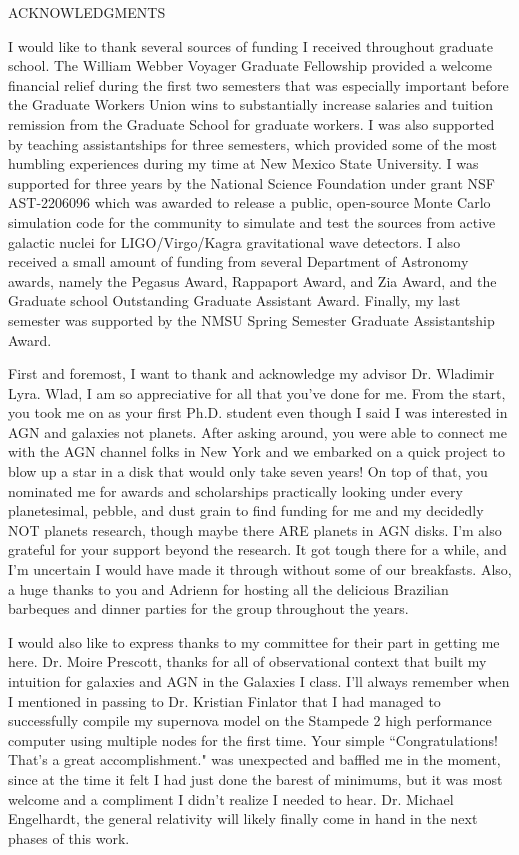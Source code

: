 \begin{center}
ACKNOWLEDGMENTS
\end{center}


I would like to thank several sources of funding I received throughout graduate school.
The William Webber Voyager Graduate Fellowship provided a welcome financial relief during the first two semesters that was especially important before the Graduate Workers Union wins to substantially increase salaries and tuition remission from the Graduate School for graduate workers.
I was also supported by teaching assistantships for three semesters, which provided some of the most humbling experiences during my time at New Mexico State University.
I was supported for three years by the National Science Foundation under grant NSF AST-2206096 which was awarded to release a public, open-source Monte Carlo simulation code for the community to simulate and test the sources from active galactic nuclei for LIGO/Virgo/Kagra gravitational wave detectors.
I also received a small amount of funding from several Department of Astronomy awards, namely the Pegasus Award, Rappaport Award, and Zia Award, and the Graduate school Outstanding Graduate Assistant Award.
Finally, my last semester was supported by the NMSU Spring Semester Graduate Assistantship Award.

First and foremost, I want to thank and acknowledge my advisor Dr. Wladimir Lyra. Wlad, I am so appreciative for all that you've done for me.
From the start, you took me on as your first Ph.D. student even though I said I was interested in AGN and galaxies not planets.
After asking around, you were able to connect me with the AGN channel folks in New York and we embarked on a quick project to blow up a star in a disk that would only take seven years!
On top of that, you nominated me for awards and scholarships practically looking under every planetesimal, pebble, and dust grain to find funding for me and my decidedly NOT planets research, though maybe there ARE planets in AGN disks.
I'm also grateful for your support beyond the research.
It got tough there for a while, and I'm uncertain I would have made it through without some of our breakfasts.
Also, a huge thanks to you and Adrienn for hosting all the delicious Brazilian barbeques and dinner parties for the group throughout the years.

I would also like to express thanks to my committee for their part in getting me here.
Dr. Moire Prescott, thanks for all of observational context that built my intuition for galaxies and AGN in the Galaxies I class.
I'll always remember when I mentioned in passing to Dr. Kristian Finlator that I had managed to successfully compile my supernova model on the Stampede 2 high performance computer using multiple nodes for the first time.
Your simple ``Congratulations! That's a great accomplishment." was unexpected and baffled me in the moment, since at the time it felt I had just done the barest of minimums, but it was most welcome and a compliment I didn't realize I needed to hear.
Dr. Michael Engelhardt, the general relativity will likely finally come in hand in the next phases of this work.

